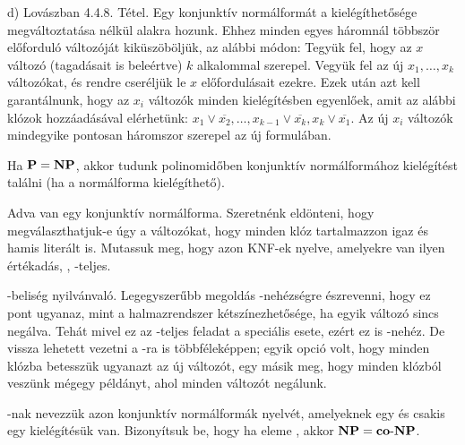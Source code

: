 \begin{Answer}
	d) Lov\'aszban 4.4.8. T\'etel. Egy konjunktív normálformát a kielégíthetősége megváltoztatása nélkül  alakra hozunk. Ehhez minden egyes háromnál többször előforduló változóját kiküszöböljük, az alábbi módon: Tegyük fel, hogy az $x$ változó (tagadásait is beleértve) $k$ alkalommal szerepel. Vegyük fel az új $x_1,\dots,x_k$ változókat, és rendre cseréljük le $x$ előfordulásait ezekre. Ezek után azt kell garantálnunk, hogy az $x_i$ változók minden kielégítésben egyenlőek, amit az alábbi klózok hozzáadásával elérhetünk: $ x_1 \vee \overline{x_2}, \dots, x_{k-1} \vee \overline{x_k}, x_k \vee \overline{x_1} $. Az új $x_i$ változók mindegyike pontosan háromszor szerepel az új formulában.
\end{Answer}

\begin{Exercise}[counter={sorszam}, difficulty=0]
	 Ha $\mbox{\ensuremath{\mathbf{P}}} = \mbox{\ensuremath{\mathbf{NP}}}$, akkor tudunk polinomidőben konjunktív normálformához kielégítést találni (ha a normálforma kielégíthető).
\end{Exercise}

\begin{Exercise}[counter={sorszam}, difficulty=0]
	Adva van egy konjunktív normálforma. Szeretnénk eldönteni, hogy megválaszthatjuk-e úgy a változókat, hogy minden klóz tartalmazzon igaz és hamis literált is. Mutassuk meg, hogy azon KNF-ek nyelve, amelyekre van ilyen \'ert\'ekad\'as, , \NP-teljes.
\end{Exercise}	
\begin{Answer}
	\NP-belis\'eg nyilv\'anval\'o.
	Legegyszer\H ubb megold\'as \NP-neh\'ezs\'egre \'eszrevenni, hogy ez pont ugyanaz, mint a halmazrendszer k\'etsz\'inezhet\H os\'ege, ha egyik v\'altoz\'o sincs neg\'alva. Teh\'at mivel ez az \NP-teljes feladat a speci\'alis esete, ez\'ert ez is \NP-neh\'ez.
	De vissza lehetett vezetni a \SAT-ra is t\"obbf\'elek\'eppen; egyik opci\'o volt, hogy minden kl\'ozba betessz\"uk ugyanazt az \'uj v\'altoz\'ot, egy m\'asik meg, hogy minden kl\'ozb\'ol vesz\"unk m\'egegy p\'eld\'anyt, ahol minden v\'altoz\'ot neg\'alunk.
\end{Answer}

\begin{Exercise}[counter={sorszam}, difficulty=1]
	-nak nevezzük azon konjunktív normálformák nyelvét, amelyeknek egy és csakis egy kielégítésük van.
	Bizonyítsuk be, hogy ha  eleme \NP, akkor $\mbox{\ensuremath{\mathbf{NP}}} = \mbox{\ensuremath{\mathbf{co\text{-}NP}}}$.
	
\end{Exercise}

